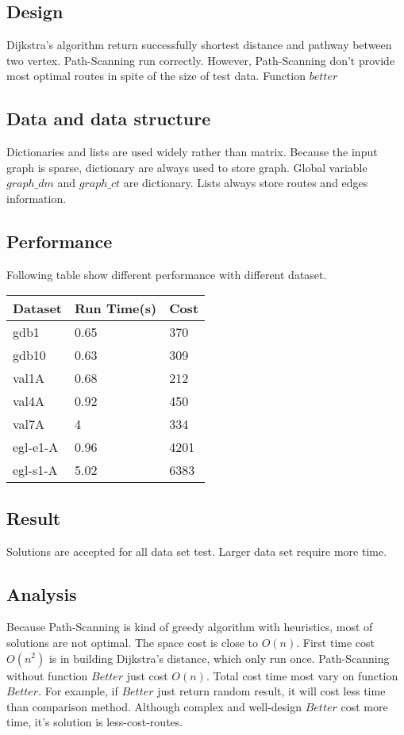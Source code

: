 \documentclass[conference,compsoc]{IEEEtran}
\begin{document}
\subsection{Design}
Dijkstra's algorithm return successfully shortest distance and pathway between
two vertex. Path-Scanning run correctly. However, Path-Scanning don't provide
most optimal routes in spite of the size of test data. Function $better$

\subsection{Data and data structure}
Dictionaries and lists are used widely rather than matrix. Because the input graph
is sparse, dictionary are always used to store graph. Global variable
$graph\_dm$ and $graph\_ct$ are dictionary. Lists always store routes and edges
information.

\subsection{Performance}
Following table show different performance with different dataset.

\begin{center}
   \begin{tabular}{| l | l | l |}
   \hline
    Dataset  & Run Time(s) & Cost \\ \hline
    gdb1     & 0.65        & 370  \\ 
    gdb10    & 0.63        & 309  \\
    val1A    & 0.68        & 212  \\
    val4A    & 0.92        & 450  \\
    val7A    & 4           & 334  \\
    egl-e1-A & 0.96        & 4201 \\
    egl-s1-A & 5.02        & 6383 \\
   \hline
   \end{tabular}
\end{center}

\subsection{Result}
Solutions are accepted for all data set test. Larger data set require more time.

\subsection{Analysis}
Because Path-Scanning is kind of greedy algorithm with heuristics, most of
solutions are not optimal. The space cost is close to $O(n)$. First time cost
$O(n^2)$ is in building Dijkstra's distance, which only run once. Path-Scanning
without function $Better$ just cost $O(n)$. Total cost time most vary on 
function $Better$. For example, if $Better$ just return random result, it will
cost less time than comparison method. Although complex and well-design $Better$
cost more time, it's solution is less-cost-routes.
\end{document}
